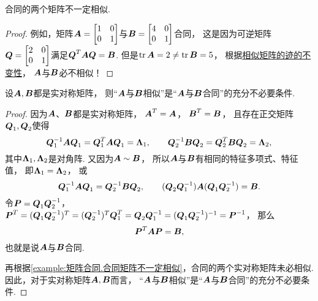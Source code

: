 \begin{proposition}\label{example:矩阵合同.合同矩阵不一定相似}
合同的两个矩阵不一定相似.
\begin{proof}
例如，矩阵\(\boldsymbol{A}=\begin{bmatrix}
	1 & 0 \\
	0 & 1
\end{bmatrix}\)与\(\boldsymbol{B}=\begin{bmatrix}
	4 & 0 \\
	0 & 1
\end{bmatrix}\)合同，
这是因为可逆矩阵\(\boldsymbol{Q}=\begin{bmatrix}
	2 & 0 \\
	0 & 1
\end{bmatrix}\)满足\(\boldsymbol{Q}^T\boldsymbol{A}\boldsymbol{Q}=\boldsymbol{B}\).
但是\(\tr\boldsymbol{A}=2 \neq \tr\boldsymbol{B} = 5\)，
根据\hyperref[theorem:特征值与特征向量.相似矩阵的迹的不变性]{相似矩阵的迹的不变性}，
\(\boldsymbol{A}\)与\(\boldsymbol{B}\)必不相似！
\end{proof}
\end{proposition}

\begin{proposition}\label{theorem:二次型.实对称矩阵相似必合同}
设\(\boldsymbol{A},\boldsymbol{B}\)都是实对称矩阵，
则“\(\boldsymbol{A}\)与\(\boldsymbol{B}\)相似”是“\(\boldsymbol{A}\)与\(\boldsymbol{B}\)合同”的充分不必要条件.
\begin{proof}
因为\(\boldsymbol{A}\)、\(\boldsymbol{B}\)都是实对称矩阵，
\(\boldsymbol{A}^T=\boldsymbol{A}\)，
\(\boldsymbol{B}^T=\boldsymbol{B}\)，
且存在正交矩阵\(\boldsymbol{Q}_1,\boldsymbol{Q}_2\)使得\begin{equation*}
	\boldsymbol{Q}_1^{-1} \boldsymbol{A} \boldsymbol{Q}_1 = \boldsymbol{Q}_1^T \boldsymbol{A} \boldsymbol{Q}_1 = \boldsymbol{\Lambda}_1,
	\qquad
	\boldsymbol{Q}_2^{-1} \boldsymbol{B} \boldsymbol{Q}_2 = \boldsymbol{Q}_2^T \boldsymbol{B} \boldsymbol{Q}_2 = \boldsymbol{\Lambda}_2,
\end{equation*}
其中\(\boldsymbol{\Lambda}_1,\boldsymbol{\Lambda}_2\)是对角阵.
又因为\(\boldsymbol{A}\sim\boldsymbol{B}\)，
所以\(\boldsymbol{A}\)与\(\boldsymbol{B}\)有相同的特征多项式、特征值，
即\(\boldsymbol{\Lambda}_1=\boldsymbol{\Lambda}_2\)，
或\begin{equation*}
	\boldsymbol{Q}_1^{-1} \boldsymbol{A} \boldsymbol{Q}_1 = \boldsymbol{Q}_2^{-1} \boldsymbol{B} \boldsymbol{Q}_2,
	\qquad
	(\boldsymbol{Q}_2 \boldsymbol{Q}_1^{-1}) \boldsymbol{A} (\boldsymbol{Q}_1 \boldsymbol{Q}_2^{-1}) = \boldsymbol{B}.
\end{equation*}
令\(\boldsymbol{P} = \boldsymbol{Q}_1 \boldsymbol{Q}_2^{-1}\)，
\(\boldsymbol{P}^T = (\boldsymbol{Q}_1 \boldsymbol{Q}_2^{-1})^T
= (\boldsymbol{Q}_2^{-1})^T \boldsymbol{Q}_1^T
= \boldsymbol{Q}_2 \boldsymbol{Q}_1^{-1}
= (\boldsymbol{Q}_1 \boldsymbol{Q}_2^{-1})^{-1}
= \boldsymbol{P}^{-1}\)，
那么\begin{equation*}
	\boldsymbol{P}^T \boldsymbol{A} \boldsymbol{P} = \boldsymbol{B},
\end{equation*}
也就是说\(\boldsymbol{A}\)与\(\boldsymbol{B}\)合同.

再根据\cref{example:矩阵合同.合同矩阵不一定相似}，合同的两个实对称矩阵未必相似.
因此，对于实对称矩阵\(\boldsymbol{A},\boldsymbol{B}\)而言，
“\(\boldsymbol{A}\)与\(\boldsymbol{B}\)相似”是“\(\boldsymbol{A}\)与\(\boldsymbol{B}\)合同”的充分不必要条件.
\end{proof}
\end{proposition}

